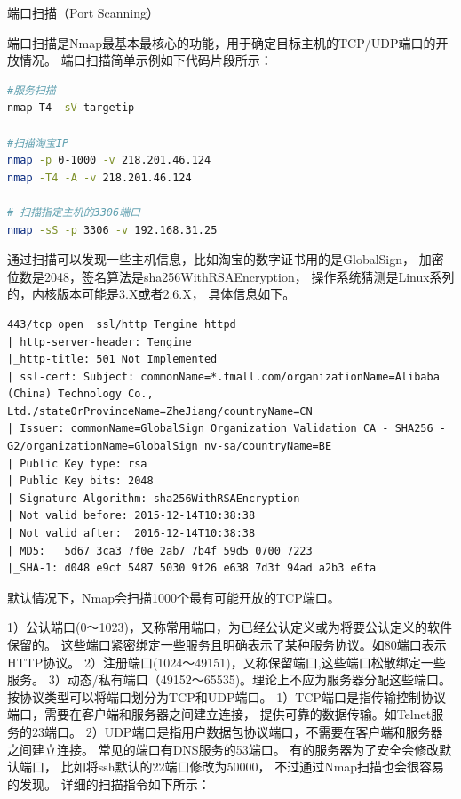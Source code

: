 \documentclass[12pt]{book}
\makeatletter
\numberwithin{dummy}{section}
\theoremstyle{ocrenumbox}
\theoremstyle{blacknumex}
\theoremstyle{blacknumbox}
\theoremstyle{ocrenum}
\renewcommand{\subsection}{\@startsection {subsection}{2}{\z@}
	{-3ex \@plus -0.1ex \@minus -.4ex}
	{0.5ex \@plus.2ex }
	{\normalfont\sffamily\bfseries}}
\makeatother
\begin{document}
\subsection{端口扫描（Port Scanning）}

端口扫描是Nmap最基本最核心的功能，用于确定目标主机的TCP/UDP端口的开放情况。
端口扫描简单示例如下代码片段所示：

\begin{lstlisting}[language=Bash]
#服务扫描
nmap-T4 -sV targetip 

#扫描淘宝IP
nmap -p 0-1000 -v 218.201.46.124
nmap -T4 -A -v 218.201.46.124

# 扫描指定主机的3306端口
nmap -sS -p 3306 -v 192.168.31.25
\end{lstlisting}

通过扫描可以发现一些主机信息，比如淘宝的数字证书用的是GlobalSign，
加密位数是2048，签名算法是sha256WithRSAEncryption，
操作系统猜测是Linux系列的，内核版本可能是3.X或者2.6.X，
具体信息如下。

\begin{lstlisting}
443/tcp open  ssl/http Tengine httpd
|_http-server-header: Tengine
|_http-title: 501 Not Implemented
| ssl-cert: Subject: commonName=*.tmall.com/organizationName=Alibaba (China) Technology Co., Ltd./stateOrProvinceName=ZheJiang/countryName=CN
| Issuer: commonName=GlobalSign Organization Validation CA - SHA256 - G2/organizationName=GlobalSign nv-sa/countryName=BE
| Public Key type: rsa
| Public Key bits: 2048
| Signature Algorithm: sha256WithRSAEncryption
| Not valid before: 2015-12-14T10:38:38
| Not valid after:  2016-12-14T10:38:38
| MD5:   5d67 3ca3 7f0e 2ab7 7b4f 59d5 0700 7223
|_SHA-1: d048 e9cf 5487 5030 9f26 e638 7d3f 94ad a2b3 e6fa
\end{lstlisting}

默认情况下，Nmap会扫描1000个最有可能开放的TCP端口。

1）公认端口(0～1023)，又称常用端口，为已经公认定义或为将要公认定义的软件保留的。
这些端口紧密绑定一些服务且明确表示了某种服务协议。如80端口表示HTTP协议。
2）注册端口(1024～49151)，又称保留端口,这些端口松散绑定一些服务。
3）动态/私有端口（49152～65535)。理论上不应为服务器分配这些端口。
按协议类型可以将端口划分为TCP和UDP端口。
1）TCP端口是指传输控制协议端口，需要在客户端和服务器之间建立连接，
提供可靠的数据传输。如Telnet服务的23端口。
2）UDP端口是指用户数据包协议端口，不需要在客户端和服务器之间建立连接。
常见的端口有DNS服务的53端口。
有的服务器为了安全会修改默认端口，
比如将ssh默认的22端口修改为50000，
不过通过Nmap扫描也会很容易的发现。
详细的扫描指令如下所示：
\end{document}
